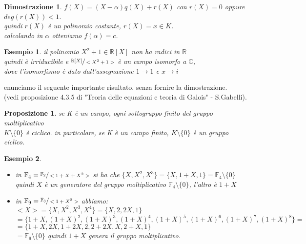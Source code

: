 \documentclass[a4paper,12pt]{article}
\theoremstyle{def}
\theoremstyle{prop}
\newtheorem*{proposition}{Proposizione}
\theoremstyle{esempio}
\newtheorem*{example}{Esempio}
\theoremstyle{dimostrazione}
\newtheorem*{dimostrazione}{Dimostrazione}
\theoremstyle{teo}
\theoremstyle{osservazione}
\begin{document}
\begin{dimostrazione}
    \(f(X) = (X - \alpha) q(X) + r(X)\) con \(r(X) = 0\) oppure \(deg(r(X)) < 1\).\\
    quindi \(r(X)\) è un polinomio costante, \(r(X) = x \in K\).\\
    calcolando in \(\alpha\) otteniamo \(f(\alpha) = c\).\\
\end{dimostrazione}

\begin{example}
    il polinomio \(X^2 + 1 \in \mathbb{R}[X]\) non ha radici in \(\mathbb{R}\)\\
    quindi è irriducibile e \(\sfrac{\mathbb{R}[X]}{<X^2 + 1>}\) è un campo isomorfo a \(\mathbb{C}\),\\
    dove l'isomorfismo è dato dall'assegnazione \(1 \rightarrow 1\) e \(x \rightarrow i\)\\
\end{example}

\newpage

enunciamo il seguente importante risultato, senza fornire la dimostrazione.\\
(vedi proposizione 4.3.5 di "Teoria delle equazioni e teoria di Galois" - S.Gabelli).\\

\begin{proposition}
    se K è un campo, ogni sottogruppo finito del gruppo moltiplicativo\\
    \(K \setminus \{0\}\) è ciclico. in particolare, se K è un campo finito, \(K \setminus \{0\}\) è un gruppo ciclico.
\end{proposition}

\begin{example}
    \begin{itemize}
        \item in \(\mathbb{F}_4 = \sfrac{\mathbb{F}_2}{<1 + X + X^2>}\) si ha che \(\{ X, X^2, X^3\} = \{ X, 1 + X, 1\} = \mathbb{F}_4 \setminus \{0\}\)\\
                quindi \(X\) è un generatore del gruppo moltiplicativo \(\mathbb{F}_4 \setminus \{0\}\), l'altro è \(1 + X\)\\
        \item in \(\mathbb{F}_9 = \sfrac{\mathbb{F}_3}{<1 + X^2>}\) abbiamo:\\ 
                \(<X> = \{X, X^2, X^3, X^4\} = \{X, 2, 2X,1\}\)\\
                \(<1 + X> = \{1 + X, (1 + X)^2, (1 + X)^3, (1 + X)^4, (1 + X)^5, (1 + X)^6, (1 + X)^7, (1 + X)^8\} =\)\\
                \(= \{1 + X, 2X, 1 + 2X, 2, 2 + 2X, X, 2 + X, 1 \}\)\\
                \(= \mathbb{F}_9 \setminus \{0\}\) quindi \(1 + X\) genera il gruppo moltiplicativo.
    \end{itemize}
\end{example}
\end{document}
